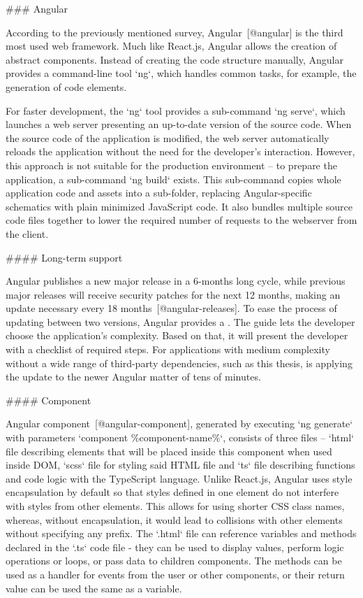 \documentclass[
  digital, %
  oneside, %
  lof,     %
  nolot,     %
]{fithesis4}
\begin{document}
### Angular

According to the previously mentioned survey, Angular~[@angular] is the third most used web framework. Much like React.js, Angular allows the creation of abstract components. Instead of creating the code structure manually, Angular provides a command-line tool `ng`, which handles common tasks, for example, the generation of code elements.

For faster development, the `ng` tool provides a sub-command `ng serve`, which launches a web server presenting an up-to-date version of the source code. When the source code of the application is modified, the web server automatically reloads the application without the need for the developer's interaction. However, this approach is not suitable for the production environment -- to prepare the application, a sub-command `ng build` exists. This sub-command copies whole application code and assets into a sub-folder, replacing Angular-specific schematics with plain minimized JavaScript code. It also bundles multiple source code files together to lower the required number of requests to the webserver from the client.

#### Long-term support

Angular publishes a new major release in a 6-months long cycle, while previous major releases will receive security patches for the next 12 months, making an update necessary every 18 months~[@angular-releases]. To ease the process of updating between two versions, Angular provides a . The guide lets the developer choose the application's complexity. Based on that, it will present the developer with a checklist of required steps. For applications with medium complexity without a wide range of third-party dependencies, such as this thesis, is applying the update to the newer Angular matter of tens of minutes.

#### Component

Angular component~[@angular-component], generated by executing `ng generate` with parameters `component \%component-name\%`, consists of three files -- `html` file describing elements that will be placed inside this component when used inside DOM, `scss` file for styling said HTML file and `ts` file describing functions and code logic with the TypeScript language. Unlike React.js, Angular uses style encapsulation by default so that styles defined in one element do not interfere with styles from other elements. This allows for using shorter CSS class names, whereas, without encapsulation, it would lead to collisions with other elements without specifying any prefix. The `.html` file can reference variables and methods declared in the `.ts` code file - they can be used to display values, perform logic operations or loops, or pass data to children components. The methods can be used as a handler for events from the user or other components, or their return value can be used the same as a variable.
\end{document}

